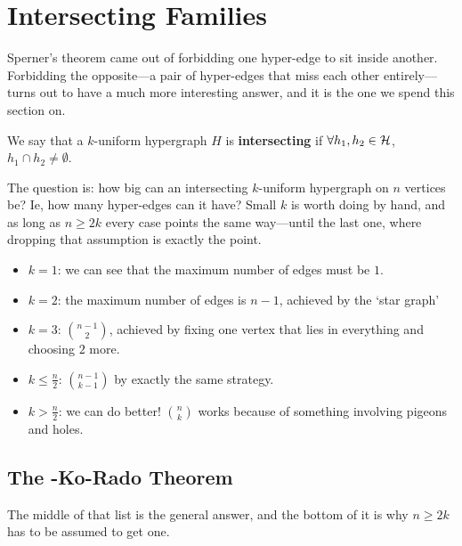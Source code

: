 \section{Intersecting Families}

Sperner's theorem came out of forbidding one hyper-edge to sit inside another. Forbidding the opposite---a pair of hyper-edges that miss each other entirely---turns out to have a much more interesting answer, and it is the one we spend this section on.

\begin{boxdefinition}[Intersecting]
    We say that a $k$-uniform hypergraph $H$ is \textbf{intersecting} if $\forall h_1, h_2 \in \mathcal{H}$, $h_1 \cap h_2 \ne \emptyset$.
\end{boxdefinition}

The question is: how big can an intersecting $k$-uniform hypergraph on $n$ vertices be? Ie, how many hyper-edges can it have? Small $k$ is worth doing by hand, and as long as $n \geq 2k$ every case points the same way---until the last one, where dropping that assumption is exactly the point.

\begin{itemize}
    \item $k = 1$: we can see that the maximum number of edges must be $1$.
    \item $k = 2$: the maximum number of edges is $n - 1$, achieved by the `star graph'
    \begin{center}
    \end{center}
    \item $k = 3$: $\binom{n-1}{2}$, achieved by fixing one vertex that lies in everything and choosing $2$ more.
    \item $k \leq \frac{n}{2}$: $\binom{n-1}{k-1}$ by exactly the same strategy.
    \item $k > \frac{n}{2}$: we can do better! $\binom{n}{k}$ works because of something involving pigeons and holes.
\end{itemize}

\subsection{The \protect\Erdos-Ko-Rado Theorem}

The middle of that list is the general answer, and the bottom of it is why $n \geq 2k$ has to be assumed to get one.

